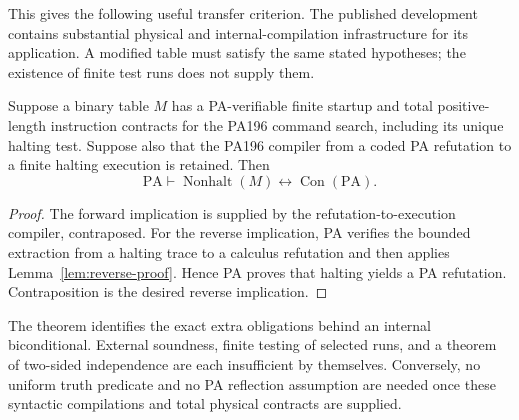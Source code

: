 This gives the following useful transfer criterion.  The published
development contains substantial physical and internal-compilation
infrastructure for its application.  A modified table must satisfy the same
stated hypotheses; the existence of finite test runs does not supply them.

\begin{theorem}
Suppose a binary table $M$ has a PA-verifiable finite startup and
total positive-length instruction contracts for the PA196 command
search, including its unique halting test.  Suppose also that the
PA196 compiler from a coded PA refutation to a finite halting
execution is retained.  Then
\[
 \mathrm{PA}\vdash
 \operatorname{Nonhalt}(M)\leftrightarrow
 \operatorname{Con}(\mathrm{PA}).
\]
\end{theorem}

\begin{proof}
The forward implication is supplied by the refutation-to-execution
compiler, contraposed.  For the reverse implication, PA verifies the
bounded extraction from a halting trace to a calculus refutation and
then applies Lemma~\ref{lem:reverse-proof}.  Hence PA proves that
halting yields a PA refutation.  Contraposition is the desired reverse
implication.
\end{proof}

The theorem identifies the exact extra obligations behind an internal
biconditional.  External soundness, finite testing of selected runs,
and a theorem of two-sided independence are each insufficient by
themselves.  Conversely, no uniform truth predicate and no PA
reflection assumption are needed once these syntactic compilations
and total physical contracts are supplied.

